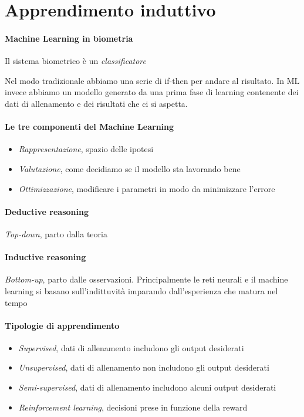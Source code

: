 \section{Apprendimento induttivo}

\paragraph{Machine Learning in biometria}
Il sistema biometrico è un \textit{classificatore}

Nel modo tradizionale abbiamo una serie di if-then per andare al risultato. In ML invece abbiamo un modello generato da una prima fase di learning contenente dei dati di allenamento e dei risultati che ci si aspetta.

\paragraph{Le tre componenti del Machine Learning}
\begin{itemize}
    \item \textit{Rappresentazione}, spazio delle ipotesi
    \item \textit{Valutazione}, come decidiamo se il modello sta lavorando bene
    \item \textit{Ottimizzazione}, modificare i parametri in modo da minimizzare l’errore
\end{itemize}

\paragraph{Deductive reasoning}
\textit{Top-down}, parto dalla teoria

\paragraph{Inductive reasoning}
\textit{Bottom-up}, parto dalle osservazioni. Principalmente le reti neurali e il machine learning si basano sull’indittuvità imparando dall’esperienza che matura nel tempo

\paragraph{Tipologie di apprendimento}
\begin{itemize}
    \item \textit{Supervised}, dati di allenamento includono gli output desiderati
    \item \textit{Unsupervised}, dati di allenamento non includono gli output desiderati
    \item \textit{Semi-supervised}, dati di allenamento includono alcuni output desiderati
    \item \textit{Reinforcement learning}, decisioni prese in funzione della reward
\end{itemize}

